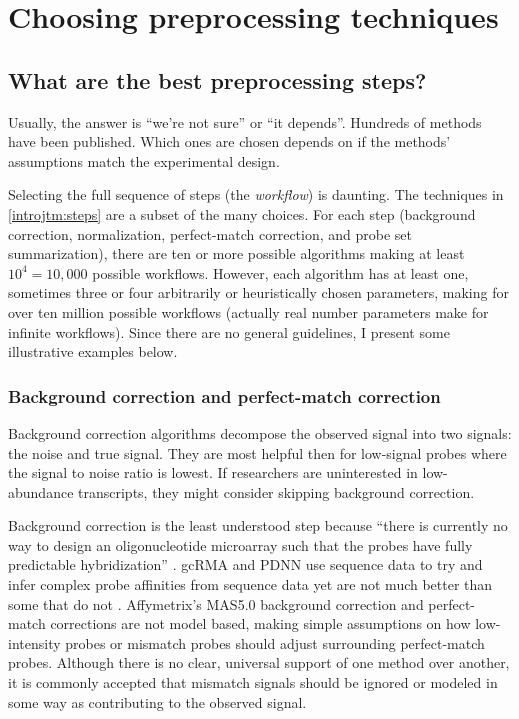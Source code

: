 \section{Choosing preprocessing techniques}

\subsection{What are the best preprocessing steps?}\label{introjtm:whatsbest}

Usually, the answer is ``we're not sure'' or ``it depends''. 
Hundreds of methods have been published.
Which ones are chosen depends on if the methods' assumptions match
the experimental design.

Selecting the full sequence of steps (the \textit{workflow}) is daunting.
The techniques in \ref{introjtm:steps} are a subset of the many choices.
For each step (background correction, normalization,
perfect-match correction, and probe set summarization), there are
ten or more possible algorithms making at least $10^4=10,000$ possible
workflows. However, each algorithm has at least one, sometimes
three or four arbitrarily or heuristically chosen parameters, making
for over ten million possible workflows (actually real number parameters make 
for infinite workflows).
Since there are no general guidelines, I present some
illustrative examples below. 

\subsubsection{Background correction and perfect-match correction}

Background correction algorithms decompose the observed
signal into two signals: the noise and true signal.
They are most helpful then for low-signal probes where
the signal to noise ratio is lowest. If researchers are uninterested
in low-abundance transcripts, they might consider skipping
background correction.

Background correction is the least understood step because
``there is currently no way to design 
an oligonucleotide microarray such that the probes have 
fully predictable hybridization'' \cite{Pozhitkov:2007go}.
gcRMA and PDNN use sequence data to try and infer complex
probe affinities from sequence data yet are not much better than
some that do not \cite{Irizarry:2003ge,Zhang:2003to,Wu:2004wh}.
Affymetrix's MAS5.0 background correction and perfect-match corrections
are not model based, making simple assumptions on how low-intensity probes
or mismatch probes should adjust surrounding perfect-match probes.
Although there is no clear, universal support of one method over another,  
it is commonly accepted that 
mismatch signals should be ignored or modeled in some way as 
contributing to the observed signal.

